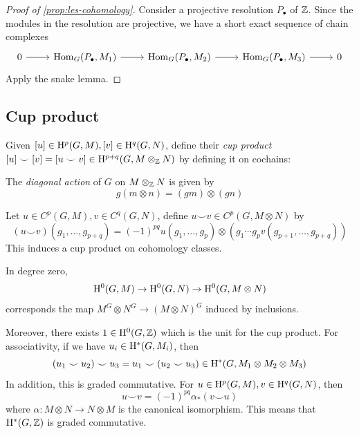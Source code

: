 \documentclass{article}
\begin{document}
\begin{proof}
    [Proof of \cref{prop:les-cohomology}] Consider a projective resolution \(P_\bullet\) of \(\mathbb{Z}\). Since the modules in the resolution are projective, we have a short exact sequence of chain complexes
    \[\begin{tikzcd}
        0 & {\Hom_G(P_\bullet, M_1)} & {\Hom_G(P_\bullet, M_2)} & {\Hom_G(P_\bullet, M_3)} & 0
        \arrow[from=1-1, to=1-2]
        \arrow[from=1-2, to=1-3]
        \arrow[from=1-3, to=1-4]
        \arrow[from=1-4, to=1-5]
    \end{tikzcd}\]
    Apply the snake lemma.
\end{proof}

\subsection{Cup product}

\begin{definition}
    Given \([u] \in \mathrm{H}^p(G, M), [v] \in \mathrm{H}^q(G, N)\), define their \emph{cup product} \([u] \smile [v] = [u \smile v] \in \mathrm{H}^{p+q}(G, M \otimes_{\mathbb{Z}} N)\) by defining it on cochains:

    The \emph{diagonal action} of \(G\) on \(M \otimes_{\mathbb{Z}} N\) is given by
    \[g(m \otimes n) = (gm) \otimes (gn)\]

    Let \(u \in C^p(G, M), v \in C^q(G, N)\), define \(u \smile v \in C^p(G, M \otimes N)\) by
    \[(u \smile v)(g_1, \dots, g_{p+q}) = (-1)^{pq}u(g_1, \dots, g_p) \otimes \left(g_1\cdots g_pv(g_{p+1}, \dots, g_{p+q})\right)\]
    This induces a cup product on cohomology classes.
\end{definition}

In degree zero,
\[\mathrm{H}^0(G, M) \to \mathrm{H}^0(G, N) \to \mathrm{H}^0(G, M \otimes N)\]
corresponds the map \(M^G \otimes N^G \to (M \otimes N)^G\) induced by inclusions.

\lec

Moreover, there exists \(1 \in \mathrm{H}^0(G, \mathbb{Z})\) which is the unit for the cup product. For associativity, if we have \(u_i \in \mathrm{H}^*(G, M_i)\), then
\[(u_1 \smile u_2) \smile u_3 = u_1 \smile (u_2 \smile u_3) \in \mathrm{H}^*(G, M_1 \otimes M_2 \otimes M_3)\]
In addition, this is graded commutative. For \(u \in \mathrm{H}^p(G, M), v \in \mathrm{H}^q(G, N)\), then
\[u \smile v = (-1)^{pq}\alpha_*(v \smile u)\]
where \(\alpha : M \otimes N \to N \otimes M\) is the canonical isomorphism. This means that \(\mathrm{H}^*(G, \mathbb{Z})\) is graded commutative.
\end{document}
